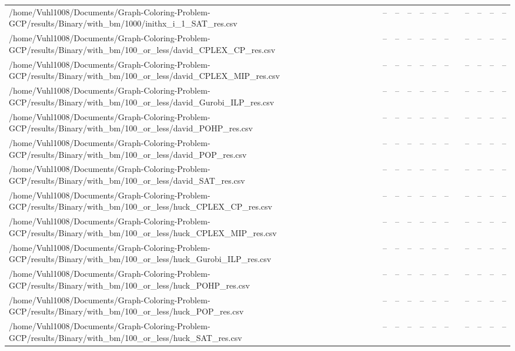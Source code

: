 \begin{table}[htbp]
\begin{tabular}{llllllllllll}
/home/Vuhl1008/Documents/Graph-Coloring-Problem-GCP/results/Binary/with\_bm/1000/inithx\_i\_1\_SAT\_res.csv & -- & -- & -- & -- & -- & -- & {} & -- & -- & -- & -- \\
/home/Vuhl1008/Documents/Graph-Coloring-Problem-GCP/results/Binary/with\_bm/100\_or\_less/david\_CPLEX\_CP\_res.csv & -- & -- & -- & -- & -- & -- & {} & -- & -- & -- & -- \\
/home/Vuhl1008/Documents/Graph-Coloring-Problem-GCP/results/Binary/with\_bm/100\_or\_less/david\_CPLEX\_MIP\_res.csv & -- & -- & -- & -- & -- & -- & {} & -- & -- & -- & -- \\
/home/Vuhl1008/Documents/Graph-Coloring-Problem-GCP/results/Binary/with\_bm/100\_or\_less/david\_Gurobi\_ILP\_res.csv & -- & -- & -- & -- & -- & -- & {} & -- & -- & -- & -- \\
/home/Vuhl1008/Documents/Graph-Coloring-Problem-GCP/results/Binary/with\_bm/100\_or\_less/david\_POHP\_res.csv & -- & -- & -- & -- & -- & -- & {} & -- & -- & -- & -- \\
/home/Vuhl1008/Documents/Graph-Coloring-Problem-GCP/results/Binary/with\_bm/100\_or\_less/david\_POP\_res.csv & -- & -- & -- & -- & -- & -- & {} & -- & -- & -- & -- \\
/home/Vuhl1008/Documents/Graph-Coloring-Problem-GCP/results/Binary/with\_bm/100\_or\_less/david\_SAT\_res.csv & -- & -- & -- & -- & -- & -- & {} & -- & -- & -- & -- \\
/home/Vuhl1008/Documents/Graph-Coloring-Problem-GCP/results/Binary/with\_bm/100\_or\_less/huck\_CPLEX\_CP\_res.csv & -- & -- & -- & -- & -- & -- & {} & -- & -- & -- & -- \\
/home/Vuhl1008/Documents/Graph-Coloring-Problem-GCP/results/Binary/with\_bm/100\_or\_less/huck\_CPLEX\_MIP\_res.csv & -- & -- & -- & -- & -- & -- & {} & -- & -- & -- & -- \\
/home/Vuhl1008/Documents/Graph-Coloring-Problem-GCP/results/Binary/with\_bm/100\_or\_less/huck\_Gurobi\_ILP\_res.csv & -- & -- & -- & -- & -- & -- & {} & -- & -- & -- & -- \\
/home/Vuhl1008/Documents/Graph-Coloring-Problem-GCP/results/Binary/with\_bm/100\_or\_less/huck\_POHP\_res.csv & -- & -- & -- & -- & -- & -- & {} & -- & -- & -- & -- \\
/home/Vuhl1008/Documents/Graph-Coloring-Problem-GCP/results/Binary/with\_bm/100\_or\_less/huck\_POP\_res.csv & -- & -- & -- & -- & -- & -- & {} & -- & -- & -- & -- \\
/home/Vuhl1008/Documents/Graph-Coloring-Problem-GCP/results/Binary/with\_bm/100\_or\_less/huck\_SAT\_res.csv & -- & -- & -- & -- & -- & -- & {} & -- & -- & -- & -- \\

\end{tabular}
\end{table}
